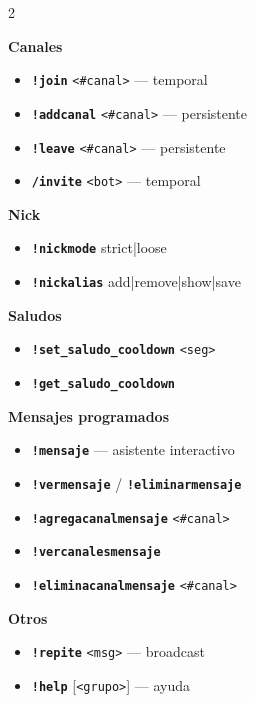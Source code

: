 \documentclass[a4paper,10pt]{article}
\newcommand{\cmd}[1]{\texttt{\color{cmdcolor}\bfseries #1}}
\newcommand{\param}[1]{\texttt{\color{paramcolor}<#1>}}
\begin{document}
\begin{multicols}{2}
\columnbreak

\textbf{Canales}
\begin{itemize}[nosep,leftmargin=1em]
  \item \cmd{!join} \param{\#canal} — temporal
  \item \cmd{!addcanal} \param{\#canal} — persistente
  \item \cmd{!leave} \param{\#canal} — persistente
  \item \cmd{/invite} \param{bot} — temporal
\end{itemize}

\textbf{Nick}
\begin{itemize}[nosep,leftmargin=1em]
  \item \cmd{!nickmode} strict|loose
  \item \cmd{!nickalias} add|remove|show|save
\end{itemize}

\textbf{Saludos}
\begin{itemize}[nosep,leftmargin=1em]
  \item \cmd{!set\_saludo\_cooldown} \param{seg}
  \item \cmd{!get\_saludo\_cooldown}
\end{itemize}

\textbf{Mensajes programados}
\begin{itemize}[nosep,leftmargin=1em]
  \item \cmd{!mensaje} — asistente interactivo
  \item \cmd{!vermensaje} / \cmd{!eliminarmensaje}
  \item \cmd{!agregacanalmensaje} \param{\#canal}
  \item \cmd{!vercanalesmensaje}
  \item \cmd{!eliminacanalmensaje} \param{\#canal}
\end{itemize}

\textbf{Otros}
\begin{itemize}[nosep,leftmargin=1em]
  \item \cmd{!repite} \param{msg} — broadcast
  \item \cmd{!help} [\param{grupo}] — ayuda
\end{itemize}

\end{multicols}
\end{document}
